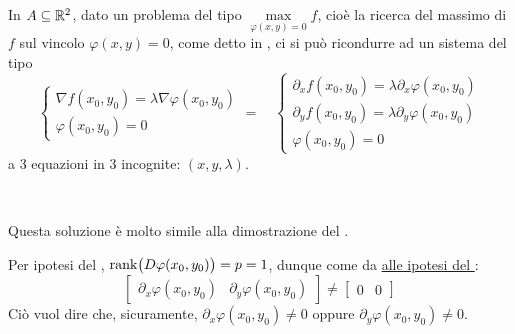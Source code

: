 \begin{example}
	\label{ex:molt_lagr_sist_equiv}
	In $A \subseteq \mathbb{R}^2$, dato un problema del tipo $\max\limits_{\varphi(x,y)=0} f$, cioè la ricerca del massimo di $f$ sul vincolo $\varphi(x,y)=0$, come detto in , ci si può ricondurre ad un sistema del tipo
	\[
		\begin{cases}
			\nabla f(x_0,y_0) = \lambda \nabla \varphi(x_0,y_0)\\
			\varphi(x_0,y_0)=0
		\end{cases}
		= \quad
		\begin{cases}
			\partial_xf(x_0,y_0) = \lambda \partial_x \varphi(x_0,y_0)\\
			\partial_yf(x_0,y_0) = \lambda \partial_y\varphi(x_0,y_0)\\
			\varphi(x_0,y_0)=0
		\end{cases}
	\]
	a 3 equazioni in 3 incognite: $(x, y, \lambda)$.
	\begin{solution}~
		\begin{note}
			Questa soluzione è molto simile alla dimostrazione del .
		\end{note}
		Per ipotesi del , $\operatorname{rank} \bigl( D\varphi(x_0, y_0) \bigr) = p = 1$, dunque come da \hyperlink{note:teo_molt_lagr_gen}{\notestyle{} alle ipotesi del }:
		\[
			\begin{bmatrix}
				\partial_x\varphi(x_0,y_0) & \partial_y\varphi(x_0,y_0)
			\end{bmatrix}
			\neq
			\begin{bmatrix}
				0 & 0
			\end{bmatrix}
		\]
		Ciò vuol dire che, sicuramente, $\partial_x \varphi(x_0,y_0) \neq 0$ oppure $\partial_y \varphi(x_0,y_0) \neq 0$.


\end{solution}
\end{example}
